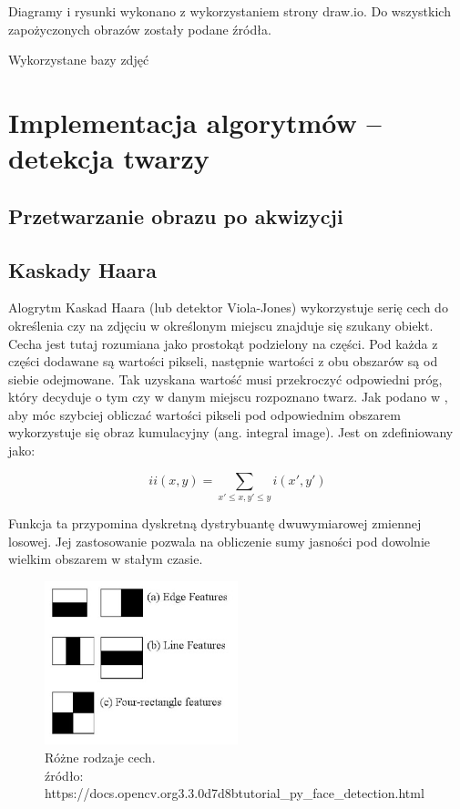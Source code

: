 \documentclass{article}
\begin{document}
Diagramy i rysunki wykonano z wykorzystaniem strony draw.io. Do wszystkich zapożyczonych obrazów zostały podane źródła.

Wykorzystane bazy zdjęć

\newpage

\section{Implementacja algorytmów – detekcja twarzy}
 
\subsection{Przetwarzanie obrazu po akwizycji} 
 

\subsection{Kaskady Haara}
Alogrytm Kaskad Haara (lub detektor Viola-Jones) wykorzystuje serię cech do określenia czy na zdjęciu w określonym miejscu znajduje się szukany obiekt. Cecha jest tutaj rozumiana jako prostokąt podzielony na części. Pod każda z części dodawane są wartości pikseli, następnie wartości z obu obszarów są od siebie odejmowane. Tak uzyskana wartość musi przekroczyć odpowiedni próg, który decyduje o tym czy w danym miejscu rozpoznano twarz. Jak podano w \cite{Kaskada Haara}, aby móc szybciej obliczać wartości pikseli pod odpowiednim obszarem wykorzystuje się obraz kumulacyjny (ang. integral image). Jest on zdefiniowany jako:

\begin{equation}
	ii(x,y) = \sum_{x' \leq x, y' \leq y} i(x',y')
\end{equation}

Funkcja ta przypomina dyskretną dystrybuantę dwuwymiarowej zmiennej losowej. Jej zastosowanie pozwala na obliczenie sumy jasności pod dowolnie wielkim obszarem w stałym czasie.

\begin{figure}
\centering
	\includegraphics[width=0.50\textwidth]{haar_features.jpg}\par\vspace{1cm}
\caption{Różne rodzaje cech. \\ źródło: https://docs.opencv.org\/3.3.0\/d7\/d8b\/tutorial\_py\_face\_detection.html}
	\label{fig:gradient}
\end{figure}
\end{document}
